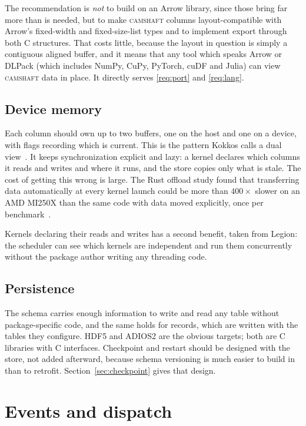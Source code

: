 \documentclass[11pt,a4paper]{article}
\newcommand{\camshaft}{\textsc{camshaft}}
\begin{document}
The recommendation is \emph{not} to build on an Arrow library, since those
bring far more than is needed, but to make \camshaft{} columns layout-compatible
with Arrow's fixed-width and fixed-size-list types and to implement export
through both C structures.  That costs little, because the layout in question
is simply a contiguous aligned buffer, and it means that any tool which speaks
Arrow or DLPack (which includes NumPy, CuPy, PyTorch, cuDF and Julia) can view
\camshaft{} data in place.  It directly serves \ref{req:port} and \ref{req:lang}.

\subsection{Device memory}
\label{sec:device-memory}

Each column should own up to two buffers, one on the host and one on a device,
with flags recording which is current.  This is the pattern Kokkos calls a
dual view~\cite{kokkos3}.  It keeps synchronization explicit and lazy: a
kernel declares which columns it reads and writes and where it runs, and the
store copies only what is stale.  The cost of getting this wrong is large.
The Rust offload study found that transferring data automatically at every
kernel launch could be more than $400\times$ slower on an AMD MI250X than the
same code with data moved explicitly, once per benchmark~\cite{rustoffload}.

Kernels declaring their reads and writes has a second benefit, taken from
Legion: the scheduler can see which kernels are independent and run them
concurrently without the package author writing any threading code.

\subsection{Persistence}

The schema carries enough information to write and read any table without
package-specific code, and the same holds for records, which are written
with the tables they configure.  HDF5 and ADIOS2 are the obvious targets; both are C
libraries with C interfaces.  Checkpoint and restart should be designed with
the store, not added afterward, because schema versioning is much easier to
build in than to retrofit.  Section~\ref{sec:checkpoint} gives that design.

\section{Events and dispatch}
\label{sec:dispatch}
\end{document}
